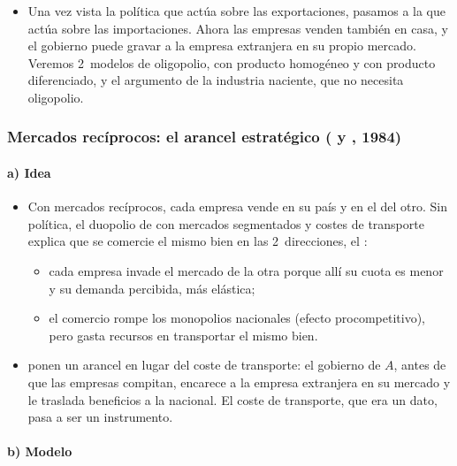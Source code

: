 \documentclass[11pt]{article}
\begin{document}
\begin{itemize}
\item Una vez vista la política que actúa sobre las exportaciones, pasamos a la que actúa sobre las importaciones. Ahora las empresas venden también en casa, y el gobierno puede gravar a la empresa extranjera en su propio mercado. Veremos 2~modelos de oligopolio, con producto homogéneo y con producto diferenciado, y el argumento de la industria naciente, que no necesita oligopolio.
\end{itemize}

\subsubsection{Mercados recíprocos: el arancel estratégico ( y , 1984)}\label{sec:mercados-reciprocos}

\paragraph{a) Idea}

\begin{itemize}
\item Con mercados recíprocos, cada empresa vende en su país y en el del otro. Sin política, el duopolio de  con mercados segmentados y costes de transporte explica que se comercie el mismo bien en las 2~direcciones, el \nocite{Brander1981Intra,BranderKrugman1983Reciprocal} :
  \begin{itemize}
  \item cada empresa invade el mercado de la otra porque allí su cuota es menor y su demanda percibida, más elástica;
  \item el comercio rompe los monopolios nacionales (efecto procompetitivo), pero gasta recursos en transportar el mismo bien.
  \end{itemize}
\item \textcite{BranderSpencer1984Tariff} ponen un arancel en lugar del coste de transporte: el gobierno de $A$, antes de que las empresas compitan, encarece a la empresa extranjera en su mercado y le traslada beneficios a la nacional\nocite{Brander1995Strategic}. El coste de transporte, que era un dato, pasa a ser un instrumento.
\end{itemize}

\paragraph{b) Modelo}
\end{document}
